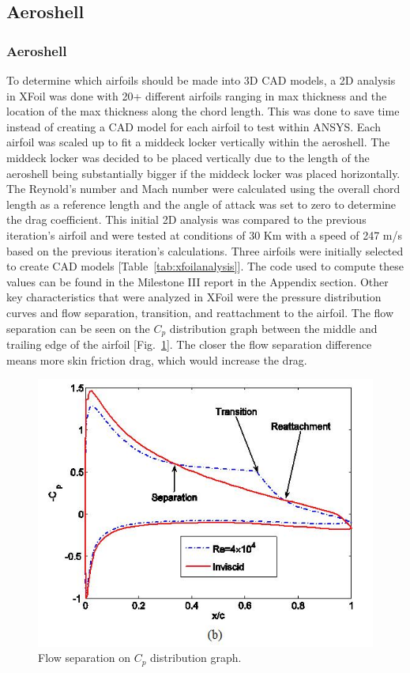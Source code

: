 \subsection{Aeroshell}

\subsubsection{Aeroshell}

\indent\indent To determine which airfoils should be made into 3D CAD models, a 2D analysis in XFoil was done with 20+ different airfoils ranging in max thickness and the location of the max thickness along the chord length. This was done to save time instead of creating a CAD model for each airfoil to test within ANSYS. Each airfoil was scaled up to fit a middeck locker vertically within the aeroshell. The middeck locker was decided to be placed vertically due to the length of the aeroshell being substantially bigger if the middeck locker was placed horizontally. The Reynold's number and Mach number were calculated using the overall chord length as a reference length and the angle of attack was set to zero to determine the drag coefficient. This initial 2D analysis was compared to the previous iteration's airfoil and were tested at conditions of 30 Km with a speed of 247 m/s based on the previous iteration's calculations. Three airfoils were initially selected to create CAD models [Table~\ref{tab:xfoilanalysis}]. The code used to compute these values can be found in the Milestone III report in the Appendix section. Other key characteristics that were analyzed in XFoil were the pressure distribution curves and flow separation, transition, and reattachment to the airfoil. The flow separation can be seen on the $C_p$ distribution graph between the middle and trailing edge of the airfoil [Fig.~\ref{fig:flowseparation}]. The closer the flow separation difference means more skin friction drag, which would increase the drag.

\begin{figure}[ht]
  \centering
  \includegraphics[width=.5\textwidth]{Aeroshell/flowseparation.png}
  \caption{\label{fig:flowseparation}Flow separation on $C_p$ distribution graph.}
\end{figure}

